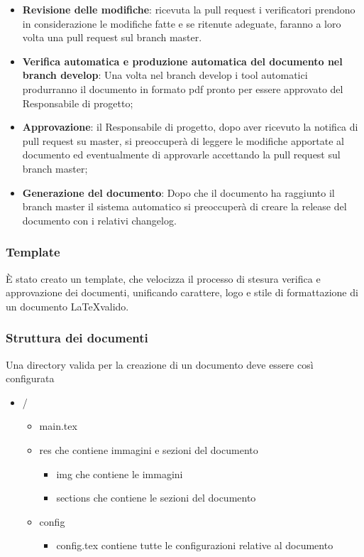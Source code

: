 \begin{itemize}
  \item \textbf{Revisione delle modifiche}: ricevuta la pull request i verificatori
  prendono in considerazione le modifiche fatte e se ritenute adeguate, faranno a
  loro volta una pull request sul branch master.

  \item \textbf{Verifica automatica e produzione automatica del documento nel
  branch develop}: Una volta nel branch develop i tool automatici produrranno il
  documento in formato pdf pronto per essere approvato del Responsabile di progetto;

  \item \textbf{Approvazione}: il Responsabile di progetto, dopo aver ricevuto la notifica
  di pull request su master, si preoccuper\`a di leggere le modifiche apportate al documento
  ed eventualmente di approvarle accettando la pull request sul branch master;

  \item \textbf{Generazione del documento}: Dopo che il documento ha raggiunto il
  branch master il sistema automatico si preoccuper\`a di creare la release del
  documento con i relativi changelog.
\end{itemize}

\subsubsection{Template}
\`E stato creato un template, che velocizza il processo di stesura verifica e
approvazione dei documenti, unificando carattere, logo e stile di formattazione
di un documento \LaTeX \space valido.

\subsubsection{Struttura dei documenti}
Una directory valida per la creazione di un documento deve essere così configurata
\begin{itemize}
  \item /
  \begin{itemize}
    \item main.tex
    \item res che contiene immagini e sezioni del documento
    \begin{itemize}
      \item img che contiene le immagini
      \item sections che contiene le sezioni del documento
    \end{itemize}
    \item config
    \begin{itemize}
      \item config.tex contiene tutte le configurazioni relative al documento
    \end{itemize}
  \end{itemize}
\end{itemize}

